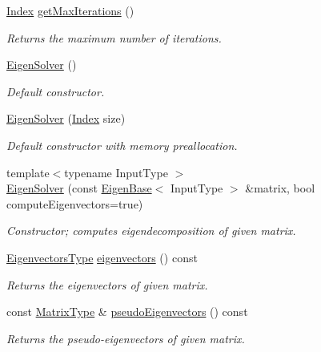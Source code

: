 \begin{DoxyCompactItemize}
\hyperlink{group___eigenvalues___module_a5bff6a6bc0efac67d52c60c2c3deb9ee}{Index} \hyperlink{group___eigenvalues___module_aa7668af4bcb47cd92cfe10640589d88f}{get\+Max\+Iterations} ()
\begin{DoxyCompactList}\small\item\em Returns the maximum number of iterations. \end{DoxyCompactList}\item 
\hyperlink{group___eigenvalues___module_a3af22d721a6401365881b2ef252d26aa}{Eigen\+Solver} ()
\begin{DoxyCompactList}\small\item\em Default constructor. \end{DoxyCompactList}\item 
\hyperlink{group___eigenvalues___module_aa4edf56ecc178b277b75c13a2ca1089f}{Eigen\+Solver} (\hyperlink{group___eigenvalues___module_a5bff6a6bc0efac67d52c60c2c3deb9ee}{Index} size)
\begin{DoxyCompactList}\small\item\em Default constructor with memory preallocation. \end{DoxyCompactList}\item 
{\footnotesize template$<$typename Input\+Type $>$ }\\\hyperlink{group___eigenvalues___module_a7e8ab3d89ea525af5f27f1a8e805fae1}{Eigen\+Solver} (const \hyperlink{group___core___module_struct_eigen_1_1_eigen_base}{Eigen\+Base}$<$ Input\+Type $>$ \&matrix, bool compute\+Eigenvectors=true)
\begin{DoxyCompactList}\small\item\em Constructor; computes eigendecomposition of given matrix. \end{DoxyCompactList}\item 
\hyperlink{group___eigenvalues___module_aa140354e2f7d5ce34c6488c39e19f2c2}{Eigenvectors\+Type} \hyperlink{group___eigenvalues___module_a0d6a1827def804c4b873679bdff6615a}{eigenvectors} () const
\begin{DoxyCompactList}\small\item\em Returns the eigenvectors of given matrix. \end{DoxyCompactList}\item 
const \hyperlink{group___eigenvalues___module_a83acd180404ddaac8a678fa65a6b632b}{Matrix\+Type} \& \hyperlink{group___eigenvalues___module_a4e796226f06e1f7347cf03a38755a155}{pseudo\+Eigenvectors} () const
\begin{DoxyCompactList}\small\item\em Returns the pseudo-\/eigenvectors of given matrix. \end{DoxyCompactList}\item 

\end{DoxyCompactItemize}
